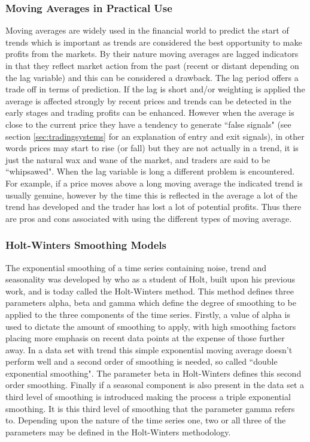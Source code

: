 \subsubsection{Moving Averages in Practical Use }
Moving averages are widely used in the financial world to predict the start of trends which is important as trends are considered the best opportunity to make profits from the markets. By their nature moving averages are lagged indicators in that they reflect market action from the past (recent or distant depending on the lag variable) and this can be considered a drawback. The lag period offers a trade off in terms of prediction. If the lag is short and/or weighting is applied the average is affected strongly by recent prices and trends can be detected in the early stages and trading profits can be enhanced. However when the average is close to the current price they have a tendency to generate \textquotedblleft false signals" (see section \ref{sec:tradingsystems} for an explanation of entry and exit signals), in other words prices may start to rise (or fall) but they are not actually in a trend, it is just the natural wax and wane of the market, and traders are said to be \textquotedblleft whipsawed". When the lag variable is long a different problem is encountered. For example, if a price moves above a long moving average the indicated trend is usually genuine, however by the time this is reflected in the average a lot of the trend has developed and the trader has lost a lot of potential profits. Thus there are pros and cons associated with using the different types of moving average.

\subsubsection{Holt-Winters Smoothing Models}
\label{sec:holtwinters}
The exponential smoothing of a time series containing noise, trend and seasonality was developed by \cite{Winters1960} who as a student of Holt, built upon his previous work, and is today called the Holt-Winters method. This method defines three parameters alpha, beta and gamma which define the degree of smoothing to be applied to the three components of the time series. Firstly, a value of alpha is used to dictate the amount of smoothing to apply, with high smoothing factors placing more emphasis on recent data points at the expense of those further away. In a data set with trend this simple exponential moving average doesn't perform well and a second order of smoothing is needed, so called \textquotedblleft double exponential smoothing". The parameter beta in Holt-Winters defines this second order smoothing. Finally if a seasonal component is also present in the data set a third level of smoothing is introduced making the process a triple exponential smoothing. It is this third level of smoothing that the parameter gamma refers to. Depending upon the nature of the time series one, two or all three of the parameters may be defined in the Holt-Winters methodology.

